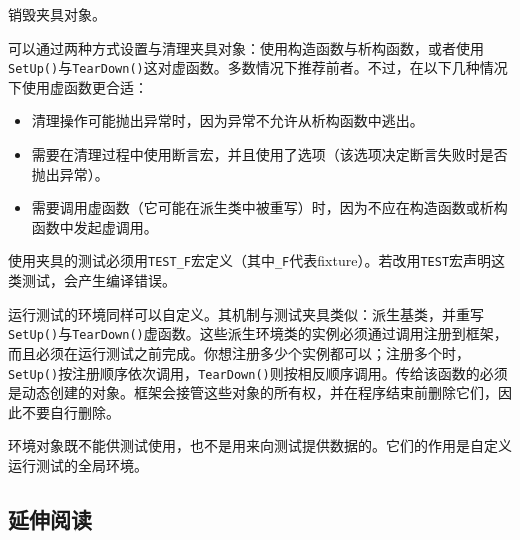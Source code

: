 销毁夹具对象。



可以通过两种方式设置与清理夹具对象：使用构造函数与析构函数，或者使用\texttt{SetUp()}与\texttt{TearDown()}这对虚函数。多数情况下推荐前者。不过，在以下几种情况下使用虚函数更合适：



\begin{itemize}
\item 清理操作可能抛出异常时，因为异常不允许从析构函数中逃出。



\item 需要在清理过程中使用断言宏，并且使用了选项（该选项决定断言失败时是否抛出异常）。



\item 需要调用虚函数（它可能在派生类中被重写）时，因为不应在构造函数或析构函数中发起虚调用。

\end{itemize}



使用夹具的测试必须用\texttt{TEST\_\allowbreak{}F}宏定义（其中\texttt{\_\allowbreak{}F}代表fixture）。若改用\texttt{TEST}宏声明这类测试，会产生编译错误。



运行测试的环境同样可以自定义。其机制与测试夹具类似：派生基类，并重写\texttt{SetUp()}与\texttt{TearDown()}虚函数。这些派生环境类的实例必须通过调用注册到框架，而且必须在运行测试之前完成。你想注册多少个实例都可以；注册多个时，\texttt{SetUp()}按注册顺序依次调用，\texttt{TearDown()}则按相反顺序调用。传给该函数的必须是动态创建的对象。框架会接管这些对象的所有权，并在程序结束前删除它们，因此不要自行删除。



\begin{myNote}
环境对象既不能供测试使用，也不是用来向测试提供数据的。它们的作用是自定义运行测试的全局环境。
\end{myNote}



\subsection{延伸阅读}


